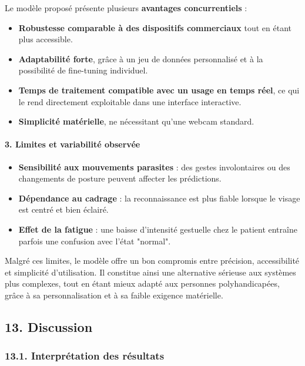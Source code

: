 \documentclass[
]{article}
\begin{document}
Le modèle proposé présente plusieurs \textbf{avantages concurrentiels} :

\begin{itemize}
\item
  \textbf{Robustesse comparable à des dispositifs commerciaux} tout en étant plus accessible.
\item
  \textbf{Adaptabilité forte}, grâce à un jeu de données personnalisé et à la possibilité de fine-tuning individuel.
\item
  \textbf{Temps de traitement compatible avec un usage en temps réel}, ce qui le rend directement exploitable dans une interface interactive.
\item
  \textbf{Simplicité matérielle}, ne nécessitant qu'une webcam standard.
\end{itemize}

\hypertarget{limites-et-variabilituxe9-observuxe9e}{%
\paragraph{\texorpdfstring{\textbf{3. Limites et variabilité observée}}{3. Limites et variabilité observée}}\label{limites-et-variabilituxe9-observuxe9e}}

\begin{itemize}
\item
  \textbf{Sensibilité aux mouvements parasites} : des gestes involontaires ou des changements de posture peuvent affecter les prédictions.
\item
  \textbf{Dépendance au cadrage} : la reconnaissance est plus fiable lorsque le visage est centré et bien éclairé.
\item
  \textbf{Effet de la fatigue} : une baisse d'intensité gestuelle chez le patient entraîne parfois une confusion avec l'état "normal".
\end{itemize}

Malgré ces limites, le modèle offre un bon compromis entre précision, accessibilité et simplicité d'utilisation. Il constitue ainsi une alternative sérieuse aux systèmes plus complexes, tout en étant mieux adapté aux personnes polyhandicapées, grâce à sa personnalisation et à sa faible exigence matérielle.

\hypertarget{discussion}{%
\subsection{13. Discussion}\label{discussion}}

\hypertarget{interpruxe9tation-des-ruxe9sultats}{%
\subsubsection{13.1. Interprétation des résultats}\label{interpruxe9tation-des-ruxe9sultats}}
\end{document}
